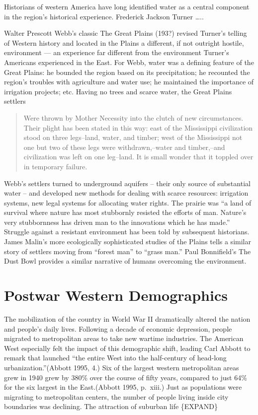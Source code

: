 \documentclass[11pt,article,oneside]{memoir}
\begin{document}
Historians of western America have long identified water as a central
component in the region's historical experience. Frederick Jackson
Turner \ldots{}..

Walter Prescott Webb's classic The Great Plains (193?) revised Turner's
telling of Western history and located in the Plains a different, if not
outright hostile, environment --- an experience far different from the
environment Turner's Americans experienced in the East. For Webb, water
was a defining feature of the Great Plains: he bounded the region based
on its precipitation; he recounted the region's troubles with
agriculture and water use; he maintained the importance of irrigation
projects; etc. Having no trees and scarce water, the Great Plains
settlers

\begin{quote}
Were thrown by Mother Necessity into the clutch of new circumstances.
Their plight has been stated in this way: east of the Mississippi
civilization stood on three legs--land, water, and timber; west of the
Mississippi not one but two of these legs were withdrawn,--water and
timber,--and civilization was left on one leg--land. It is small wonder
that it toppled over in temporary failure.
\end{quote}

Webb's settlers turned to underground aquifers -- their only source of
substantial water -- and developed new methods for dealing with scarce
resources: irrigation systems, new legal systems for allocating water
rights. The prairie was ``a land of survival where nature has most
stubbornly resisted the efforts of man. Nature's very stubbornness has
driven man to the innovations which he has made.'' Struggle against a
resistant environment has been told by subsequent historians. James
Malin's more ecologically sophisticated studies of the Plains tells a
similar story of settlers moving from ``forest man'' to ``grass man.''
Paul Bonnifield's The Dust Bowl provides a similar narrative of humans
overcoming the environment.

\section{Postwar Western Demographics}

The mobilization of the country in World War II dramatically altered the
nation and people's daily lives. Following a decade of economic
depression, people migrated to metropolitan areas to take new wartime
industries. The American West especially felt the impact of this
demographic shift, leading Carl Abbott to remark that launched ``the
entire West into the half-century of head-long urbanization.''(Abbott
1995, 4.) Six of the largest western metropolitan areas grew in 1940
grew by 380\% over the course of fifty years, compared to just 64\% for
the six largest in the East.(Abbott 1995, p.~xiii.) Just as populations
were migrating to metropolitan centers, the number of people living
inside city boundaries was declining. The attraction of suburban life
\{EXPAND\}
\end{document}
